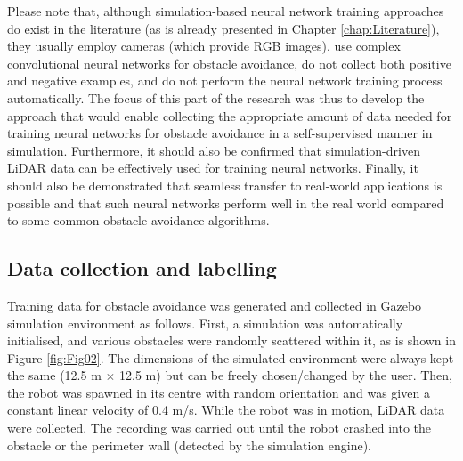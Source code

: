 Please note that, although simulation-based neural network training approaches do exist in the literature (as is already presented in Chapter \ref{chap:Literature}), they usually employ cameras (which provide RGB images), use complex convolutional neural networks for obstacle avoidance, do not collect both positive and negative examples, and do not perform the neural network training process automatically. The focus of this part of the research was thus to develop the approach that would enable collecting the appropriate amount of data needed for training neural networks for obstacle avoidance in a self-supervised manner in simulation. Furthermore, it should also be confirmed that simulation-driven LiDAR data can be effectively used for training neural networks. Finally, it should also be demonstrated that seamless transfer to real-world applications is possible and that such neural networks perform well in the real world compared to some common obstacle avoidance algorithms.

\subsection{Data collection and labelling}

Training data for obstacle avoidance was generated and collected in Gazebo simulation environment \cite{Koenig2004} as follows. First, a simulation was automatically initialised, and various obstacles were randomly scattered within it, as is shown in Figure \ref{fig:Fig02}. The dimensions of the simulated environment were always kept the same (12.5 m $\times$ 12.5 m) but can be freely chosen/changed by the user. Then, the robot was spawned in its centre with random orientation and was given a constant linear velocity of 0.4 m/s. While the robot was in motion, LiDAR data were collected. The recording was carried out until the robot crashed into the obstacle or the perimeter wall (detected by the simulation engine).

